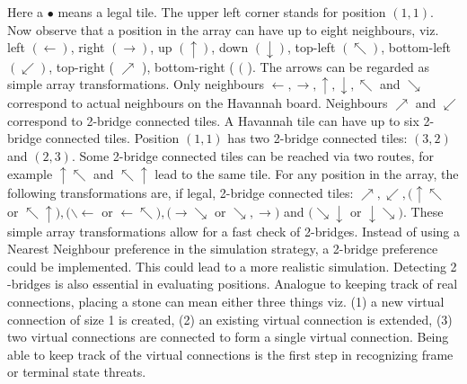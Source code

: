 \documentclass[10pt]{article}
\begin{document}
Here a $\bullet$ means a legal tile. The upper left corner stands for position $(1,1)$. Now observe that a position in the array can have up to eight neighbours, viz. left $(\leftarrow)$, right $(\rightarrow)$, up $(\uparrow)$, down $(\downarrow)$, top-left $(\nwarrow)$, bottom-left $(\swarrow)$, top-right ( $\nearrow$ ), bottom-right ( $($ ). The arrows can be regarded as simple array transformations. Only neighbours $\leftarrow, \rightarrow, \uparrow, \downarrow, \nwarrow$ and $\searrow$ correspond to actual neighbours on the Havannah board. Neighbours $\nearrow$ and $\swarrow$ correspond to 2-bridge connected tiles. A Havannah tile can have up to six 2-bridge connected tiles. Position $(1,1)$ has two 2-bridge connected tiles: $(3,2)$ and $(2,3)$. Some 2-bridge connected tiles can be reached via two routes, for example $\uparrow \nwarrow$ and $\nwarrow \uparrow$ lead to the same tile. For any position in the array, the following transformations are, if legal, 2-bridge connected tiles: $\nearrow, \swarrow,(\uparrow \nwarrow$ or $\nwarrow \uparrow),(\backslash \leftarrow$ or $\leftarrow \nwarrow),(\rightarrow \searrow$ or $\searrow, \rightarrow)$ and $(\searrow \downarrow$ or $\downarrow \searrow)$. These simple array transformations allow for a fast check of 2-bridges. Instead of using a Nearest Neighbour preference in the simulation strategy, a 2-bridge preference could be implemented. This could lead to a more realistic simulation. Detecting 2 -bridges is also essential in evaluating positions. Analogue to keeping track of real connections, placing a stone can mean either three things viz. (1) a new virtual connection of size 1 is created, (2) an existing virtual connection is extended, (3) two virtual connections are connected to form a single virtual connection. Being able to keep track of the virtual connections is the first step in recognizing frame or terminal state threats.
\end{document}
